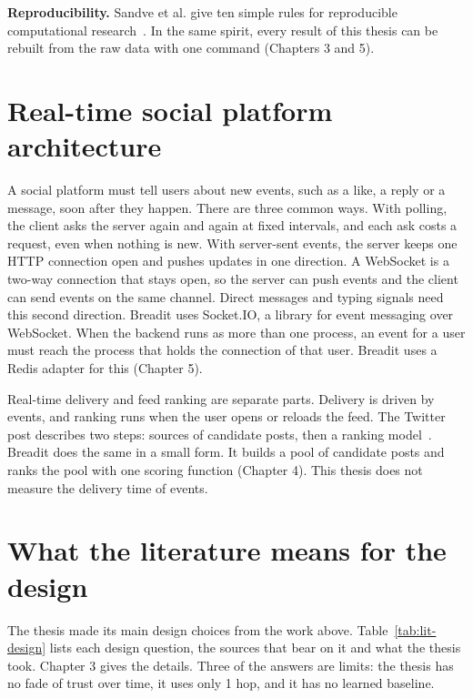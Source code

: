 \textbf{Reproducibility.} Sandve et al. give ten simple rules for reproducible computational research~. In the same spirit, every result of this thesis can be rebuilt from the raw data with one command (Chapters 3 and 5).

\section{Real-time social platform architecture}
\label{sec:lit-arch}

A social platform must tell users about new events, such as a like, a reply or a message, soon after they happen. There are three common ways. With polling, the client asks the server again and again at fixed intervals, and each ask costs a request, even when nothing is new. With server-sent events, the server keeps one HTTP connection open and pushes updates in one direction. A WebSocket is a two-way connection that stays open, so the server can push events and the client can send events on the same channel. Direct messages and typing signals need this second direction. Breadit uses Socket.IO, a library for event messaging over WebSocket. When the backend runs as more than one process, an event for a user must reach the process that holds the connection of that user. Breadit uses a Redis adapter for this (Chapter 5).

Real-time delivery and feed ranking are separate parts. Delivery is driven by events, and ranking runs when the user opens or reloads the feed. The Twitter post describes two steps: sources of candidate posts, then a ranking model~. Breadit does the same in a small form. It builds a pool of candidate posts and ranks the pool with one scoring function (Chapter 4). This thesis does not measure the delivery time of events.

\section{What the literature means for the design}
\label{sec:lit-design}

The thesis made its main design choices from the work above. Table~\ref{tab:lit-design} lists each design question, the sources that bear on it and what the thesis took. Chapter 3 gives the details. Three of the answers are limits: the thesis has no fade of trust over time, it uses only 1 hop, and it has no learned baseline.

